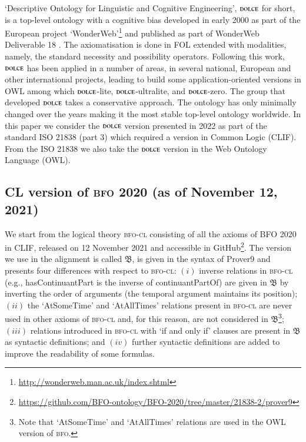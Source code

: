 \documentclass[ao]{iosart2x}
\newcommand{\nb}[1]{\textcolor{red}{$|$}\marginpar{\hspace*{-0cm}\parbox{20mm}{\scriptsize\raggedright\textcolor{red}{#1}}}}
\newcommand{\bfoDefLabel}{\textrm{d$_\texttt{b}$}}
\newcommand{\refbfodf}[1]{({\bfoDefLabel}\ref{#1})}
\newcommand{\dolce}{{\textsc{dolce}}}
\newcommand{\bfo}{{\textsc{bfo}}}
\newcommand{\bfocl}{{\textsc{bfo-cl}}}
\newcommand {\thbfo} {\ensuremath{\mathfrak{B}}}
\begin{document}
`Descriptive Ontology for Linguistic and Cognitive Engineering', $\dolce$ for short, is a top-level ontology with a cognitive bias developed in early 2000 as part of the European project `WonderWeb'\footnote{\url{http://wonderweb.man.ac.uk/index.shtml}} and published as part of WonderWeb Deliverable 18 \citep{D18}. The axiomatisation is done in FOL extended with modalities, namely, the standard necessity and possibility operators. Following this work, $\dolce$ has been applied in a number of areas, in several national, European and other international projects, leading to build some application-oriented versions in OWL among which $\dolce$-lite, $\dolce$-ultralite, and $\dolce$-zero. 
The group that developed $\dolce$ takes a conservative approach. The ontology has only minimally changed over the years making it the most stable top-level ontology worldwide. In this paper we consider the $\dolce$ version presented in 2022 as part of the standard ISO 21838 (part 3) which required a version in Common Logic (CLIF). 
From the ISO 21838 we also take the $\dolce$ version in the Web Ontology Language (OWL).

\subsection{CL version of {\bfo} 2020 (as of November 12, 2021)}\label{sect_bfo}

%

We start from the logical theory {\bfocl} consisting of all the axioms of BFO 2020 in CLIF, released on 12 November 2021 and accessible in GitHub\footnote{\url{https://github.com/BFO-ontology/BFO-2020/tree/master/21838-2/prover9}}. The version we use in the alignment is called $\thbfo$, is given in the syntax of Prover9  and presents four differences with respect to {\bfocl}: $(i)$ inverse relations in {\bfocl} (e.g., hasContinuantPart is the inverse of continuantPartOf) are given in $\thbfo$ by inverting the order of arguments (the temporal argument maintains its position);  $(ii)$ the `AtSomeTime' and `AtAllTimes' relations present in {\bfocl} are never used in other axioms of {\bfocl} and, for this reason, are not considered in $\thbfo$\footnote{Note that `AtSomeTime' and `AtAllTimes' relations are used in the OWL version of {\bfo}.}; $(iii)$ relations introduced in {\bfocl} with `if and only if' clauses are present in $\thbfo$ as syntactic definitions;
and $(iv)$ further syntactic definitions are added to improve the readability of some formulas.
\end{document}

